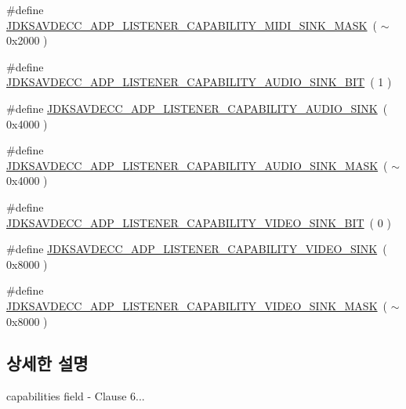 \begin{DoxyCompactItemize}
\item 
\#define \hyperlink{group__adp__listener__capability_gaffe8a468a8f23c5be14b42fc84098749}{J\+D\+K\+S\+A\+V\+D\+E\+C\+C\+\_\+\+A\+D\+P\+\_\+\+L\+I\+S\+T\+E\+N\+E\+R\+\_\+\+C\+A\+P\+A\+B\+I\+L\+I\+T\+Y\+\_\+\+M\+I\+D\+I\+\_\+\+S\+I\+N\+K\+\_\+\+M\+A\+SK}~( $\sim$0x2000 )
\item 
\#define \hyperlink{group__adp__listener__capability_ga1465f1039a92965fb8b3d052ef59d7e9}{J\+D\+K\+S\+A\+V\+D\+E\+C\+C\+\_\+\+A\+D\+P\+\_\+\+L\+I\+S\+T\+E\+N\+E\+R\+\_\+\+C\+A\+P\+A\+B\+I\+L\+I\+T\+Y\+\_\+\+A\+U\+D\+I\+O\+\_\+\+S\+I\+N\+K\+\_\+\+B\+IT}~( 1 )
\item 
\#define \hyperlink{group__adp__listener__capability_ga1d953a7125b51bbf4ea7ef484e4c4c48}{J\+D\+K\+S\+A\+V\+D\+E\+C\+C\+\_\+\+A\+D\+P\+\_\+\+L\+I\+S\+T\+E\+N\+E\+R\+\_\+\+C\+A\+P\+A\+B\+I\+L\+I\+T\+Y\+\_\+\+A\+U\+D\+I\+O\+\_\+\+S\+I\+NK}~( 0x4000 )
\item 
\#define \hyperlink{group__adp__listener__capability_gaa2123d2e970ed020f4c9cd5effaf9799}{J\+D\+K\+S\+A\+V\+D\+E\+C\+C\+\_\+\+A\+D\+P\+\_\+\+L\+I\+S\+T\+E\+N\+E\+R\+\_\+\+C\+A\+P\+A\+B\+I\+L\+I\+T\+Y\+\_\+\+A\+U\+D\+I\+O\+\_\+\+S\+I\+N\+K\+\_\+\+M\+A\+SK}~( $\sim$0x4000 )
\item 
\#define \hyperlink{group__adp__listener__capability_ga961d214be29c513d30615bd9ca84a8b4}{J\+D\+K\+S\+A\+V\+D\+E\+C\+C\+\_\+\+A\+D\+P\+\_\+\+L\+I\+S\+T\+E\+N\+E\+R\+\_\+\+C\+A\+P\+A\+B\+I\+L\+I\+T\+Y\+\_\+\+V\+I\+D\+E\+O\+\_\+\+S\+I\+N\+K\+\_\+\+B\+IT}~( 0 )
\item 
\#define \hyperlink{group__adp__listener__capability_ga6092eeeb768f98276f9d7984d83ecae9}{J\+D\+K\+S\+A\+V\+D\+E\+C\+C\+\_\+\+A\+D\+P\+\_\+\+L\+I\+S\+T\+E\+N\+E\+R\+\_\+\+C\+A\+P\+A\+B\+I\+L\+I\+T\+Y\+\_\+\+V\+I\+D\+E\+O\+\_\+\+S\+I\+NK}~( 0x8000 )
\item 
\#define \hyperlink{group__adp__listener__capability_gaddefcbfb3932dba0f2553ed9adc74db6}{J\+D\+K\+S\+A\+V\+D\+E\+C\+C\+\_\+\+A\+D\+P\+\_\+\+L\+I\+S\+T\+E\+N\+E\+R\+\_\+\+C\+A\+P\+A\+B\+I\+L\+I\+T\+Y\+\_\+\+V\+I\+D\+E\+O\+\_\+\+S\+I\+N\+K\+\_\+\+M\+A\+SK}~( $\sim$0x8000 )
\end{DoxyCompactItemize}


\subsection{상세한 설명}
capabilities field -\/ Clause 6... 

